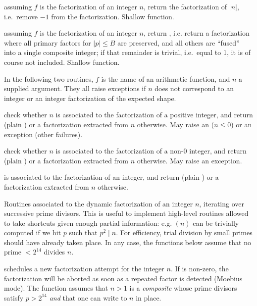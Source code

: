  assuming $f$ is the factorization of an
integer $n$, return the factorization of $|n|$, i.e.~remove $-1$ from the
factorization. Shallow function.

 assuming $f$ is the
factorization of an integer $n$, return , i.e.
return a factorization where all primary factors for $|p| \leq B$
are preserved, and all others are ``fused'' into a single composite
integer; if that remainder is trivial, i.e.~equal to 1, it is of course
not included. Shallow function.

In the following two routines, $f$ is the name of an arithmetic function,
and $n$ a supplied argument. They all raise exceptions if $n$ does not
correspond to an integer or an integer factorization of the expected shape.

 check whether $n$
is associated to the factorization of a positive integer, and return
 (plain ) or a factorization extracted from $n$ otherwise.
May raise an  ($n \leq 0$) or an  exception (other
failures).

 check whether $n$
is associated to the factorization of a non-$0$ integer, and return
 (plain ) or a factorization extracted from $n$ otherwise.
May raise an  exception.

is associated to the factorization of an integer, and return 
(plain ) or a factorization extracted from $n$ otherwise.


Routines associated to the dynamic factorization of an integer $n$, iterating
over successive prime divisors. This is useful to implement high-level
routines allowed to take shortcuts given enough partial information: e.g.
$(n)$ can be trivially computed if we hit $p$ such that $p^2
\mid n$. For efficiency, trial division by small primes should have already
taken place. In any case, the functions below assume that no prime $< 2^{14}$
divides $n$.

 schedules a new factorization
attempt for the integer $n$. If  is non-zero, the factorization
will be aborted as soon as a repeated factor is detected (Moebius mode).
The function assumes that $n > 1$ is a \emph{composite}  whose prime
divisors satisfy $p > 2^{14}$ \emph{and} that one can write to $n$ in place.


